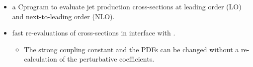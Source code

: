 \documentclass{beamer}
\begin{document}
\begin{frame}
\begin{itemize}
\ball
\item {\scriptsize \mycolor{\NLOJET~:} a C\plusn\plus program to evaluate jet production cross-sections at leading order (LO) and next-to-leading order (NLO).\\}
\tri
{}
\ball
\item {\scriptsize \mycolor{\fastNLO :} fast re-evaluations of cross-sections in interface with \NLOJETPPn. \\}
\tri
\begin{itemize}
\item {\scriptsize The strong coupling constant and the PDFs can be changed without a re-calculation of the perturbative coefficients.\\}
\end{itemize}
\ball
\end{itemize}
\end{frame}
\end{document}
